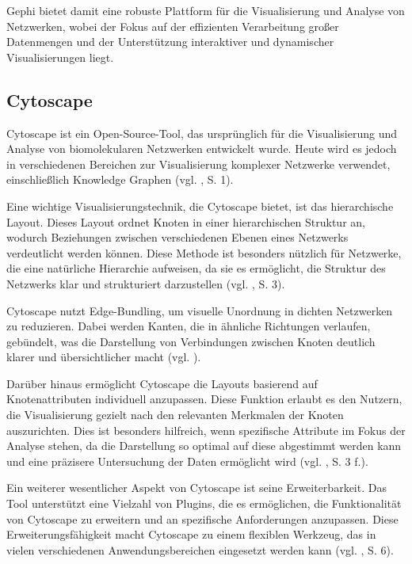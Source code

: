 Gephi bietet damit eine robuste Plattform für die Visualisierung und Analyse von Netzwerken, wobei der Fokus auf der effizienten Verarbeitung großer Datenmengen und der Unterstützung interaktiver und dynamischer Visualisierungen liegt.

\subsection{Cytoscape}

Cytoscape ist ein Open-Source-Tool, das ursprünglich für die Visualisierung und Analyse von biomolekularen Netzwerken entwickelt wurde. Heute wird es jedoch in verschiedenen Bereichen zur Visualisierung komplexer Netzwerke verwendet, einschließlich Knowledge Graphen (vgl. \cite{cytoscape:Shannon}, S. 1).

Eine wichtige Visualisierungstechnik, die Cytoscape bietet, ist das hierarchische Layout. Dieses Layout ordnet Knoten in einer hierarchischen Struktur an, wodurch Beziehungen zwischen verschiedenen Ebenen eines Netzwerks verdeutlicht werden können. Diese Methode ist besonders nützlich für Netzwerke, die eine natürliche Hierarchie aufweisen, da sie es ermöglicht, die Struktur des Netzwerks klar und strukturiert darzustellen (vgl. \cite{cytoscape:Shannon}, S. 3).

Cytoscape nutzt Edge-Bundling, um visuelle Unordnung in dichten Netzwerken zu reduzieren. Dabei werden Kanten, die in ähnliche Richtungen verlaufen, gebündelt, was die Darstellung von Verbindungen zwischen Knoten deutlich klarer und übersichtlicher macht (vgl. \cite{cytoscapeLayout:Cytoscape}).

Darüber hinaus ermöglicht Cytoscape die Layouts basierend auf Knotenattributen individuell anzupassen. Diese Funktion erlaubt es den Nutzern, die Visualisierung gezielt nach den relevanten Merkmalen der Knoten auszurichten. Dies ist besonders hilfreich, wenn spezifische Attribute im Fokus der Analyse stehen, da die Darstellung so optimal auf diese abgestimmt werden kann und eine präzisere Untersuchung der Daten ermöglicht wird (vgl. \cite{cytoscape:Shannon}, S. 3 f.).

Ein weiterer wesentlicher Aspekt von Cytoscape ist seine Erweiterbarkeit. Das Tool unterstützt eine Vielzahl von Plugins, die es ermöglichen, die Funktionalität von Cytoscape zu erweitern und an spezifische Anforderungen anzupassen. Diese Erweiterungsfähigkeit macht Cytoscape zu einem flexiblen Werkzeug, das in vielen verschiedenen Anwendungsbereichen eingesetzt werden kann (vgl. \cite{cytoscape:Shannon}, S. 6).

